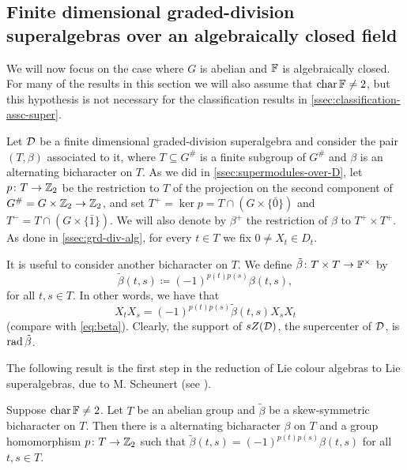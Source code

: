 \subsection{Finite dimensional graded-division superalgebras over an algebraically closed field}\label{ssec:T-beta-p}

We will now focus on the case where $G$ is abelian and $\mathbb{F}$ is algebraically closed. 
For many of the results in this section we will also assume that $\operatorname{char} \mathbb{F} \neq 2$, but this hypothesis is not necessary for the classification results in \cref{ssec:classification-assc-super}.

Let $\mathcal{D}$ be a finite dimensional graded-division superalgebra and consider the pair $(T, \beta)$ associated to it, where $T \subseteq G^\#$ is a finite subgroup of $G^\#$ and $\beta$ is an alternating bicharacter on $T$. 
As we did in \cref{ssec:supermodules-over-D}, let $p\colon T \to \mathbb{Z}_2$ be the restriction to $T$ of the projection on the second component of $G^\# = G\times \mathbb{Z}_2 \to \mathbb{Z}_2$, and set $T^+ = \ker p = T \cap (G \times \{ \bar 0 \})$ and $T^- = T \cap (G \times \{ \bar 1 \})$. 
We will also denote by $\beta^+$ the restriction of $\beta$ to $T^+ \times T^+$. 
As done in \cref{ssec:grd-div-alg}, for every $t\in T$ we fix $0 \neq X_t\in D_t$.

It is useful to consider another bicharacter on $T$. 
We define $\tilde\beta\colon T\times T \to \mathbb{F}^\times$ by
\[\label{eq:tilde-beta-def}
    \tilde\beta(t,s) \coloneqq (-1)^{p(t)p(s)}\beta(t,s),
\]
for all $t, s\in T$. 
In other words, we have that
\[\label{eq:tilde-beta}
    X_t X_s = (-1)^{p(t)p(s)} \tilde\beta(t,s) X_s X_t
\]
(compare with \cref{eq:beta}). 
Clearly, the support of $sZ(\mathcal{D})$, the supercenter of $\mathcal{D}$, is $\operatorname{rad} \tilde\beta$. 

The following result is the first step in the reduction of Lie colour algebras to Lie superalgebras, due to M. Scheunert (see \cite{MR529734}). 

\begin{prop}\label{prop:skew-bicharacter-grd-SA}
    Suppose $\operatorname{char} \mathbb{F} \neq 2$. 
    Let $T$ be an abelian group and $\tilde\beta$ be a skew-symmetric bicharacter on $T$. 
    Then there is a alternating bicharacter $\beta$ on $T$ and a group homomorphism $p\colon T \to \mathbb{Z}_2$ such that $\tilde\beta(t,s) = (-1)^{p(t)p(s)}\beta(t,s)$ for all $t,s\in T$.
\end{prop}

